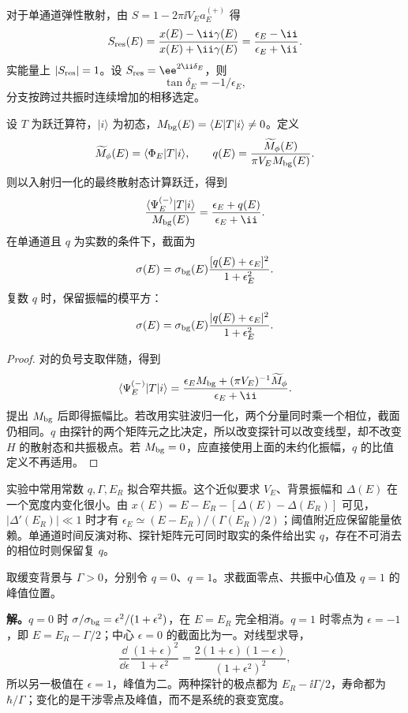 对于单通道弹性散射，由 $S=1-2\pi\ii V_Ea_E^{(+)}$ 得
\[
 S_{\rm res}(E)=\frac{x(E)-\ii\gamma(E)}{x(E)+\ii\gamma(E)}
 =\frac{\epsilon_E-\ii}{\epsilon_E+\ii}.
\]
实能量上 $|S_{\rm res}|=1$。设 $S_{\rm res}=\ee^{2\ii\delta_E}$，则
\begin{equation}
 \tan\delta_E=-1/\epsilon_E,
 \label{eq:fano-phase-shift}
\end{equation}
分支按跨过共振时连续增加的相移选定。

\begin{proposition}
设 $T$ 为跃迁算符，$|i\rangle$ 为初态，$M_{\rm bg}(E)=\langle E|T|i\rangle\ne0$。定义
\[
 \widetilde M_\phi(E)=\langle\Phi_E|T|i\rangle,
 \qquad q(E)=\frac{\widetilde M_\phi(E)}{\pi V_EM_{\rm bg}(E)}.
\]
则以入射归一化的最终散射态计算跃迁，得到
\[
 \frac{\langle\Psi_E^{(-)}|T|i\rangle}{M_{\rm bg}(E)}
 =\frac{\epsilon_E+q(E)}{\epsilon_E+\ii}.
\]
在单通道且 $q$ 为实数的条件下，截面为
\begin{equation}
 \sigma(E)=\sigma_{\rm bg}(E)
 \frac{[q(E)+\epsilon_E]^2}{1+\epsilon_E^2}.
 \label{eq:fano-profile}
\end{equation}
复数 $q$ 时，保留振幅的模平方：
\begin{equation}
\sigma(E)=\sigma_{\rm bg}(E)\frac{|q(E)+\epsilon_E|^2}{1+\epsilon_E^2}.
\label{eq:phys-rl-fano-profile}
\end{equation}
\end{proposition}
\begin{proof}
对的负号支取伴随，得到
\[
 \langle\Psi_E^{(-)}|T|i\rangle
 =\frac{\epsilon_EM_{\rm bg}+(\pi V_E)^{-1}\widetilde M_\phi}
 {\epsilon_E+\ii}.
\]
提出 $M_{\rm bg}$ 后即得振幅比。若改用实驻波归一化，两个分量同时乘一个相位，截面仍相同。$q$ 由探针的两个矩阵元之比决定，所以改变探针可以改变线型，却不改变 $H$ 的散射态和共振极点。若 $M_{\rm bg}=0$，应直接使用上面的未约化振幅，$q$ 的比值定义不再适用。
\end{proof}

实验中常用常数 $q,\Gamma,E_R$ 拟合窄共振。这个近似要求 $V_E$、背景振幅和 $\Delta(E)$ 在一个宽度内变化很小。由
$x(E)=E-E_R-[\Delta(E)-\Delta(E_R)]$
可见，$|\Delta'(E_R)|\ll1$ 时才有 $\epsilon_E\simeq(E-E_R)/(\Gamma(E_R)/2)$；阈值附近应保留能量依赖。单通道时间反演对称、探针矩阵元可同时取实的条件给出实 $q$，存在不可消去的相位时则保留复 $q$。

\begin{workedexample}[相同共振极点下的两种探针线型]
取缓变背景与 $\Gamma>0$，分别令 $q=0$、$q=1$。求截面零点、共振中心值及 $q=1$ 的峰值位置。

\textbf{解。}$q=0$ 时 $\sigma/\sigma_{\rm bg}=\epsilon^2/(1+\epsilon^2)$，在 $E=E_R$ 完全相消。$q=1$ 时零点为 $\epsilon=-1$，即 $E=E_R-\Gamma/2$；中心 $\epsilon=0$ 的截面比为一。对线型求导，
\[
 \frac{\dd}{\dd\epsilon}\frac{(1+\epsilon)^2}{1+\epsilon^2}
 =\frac{2(1+\epsilon)(1-\epsilon)}{(1+\epsilon^2)^2},
\]
所以另一极值在 $\epsilon=1$，峰值为二。两种探针的极点都为 $E_R-\ii\Gamma/2$，寿命都为 $\hbar/\Gamma$；变化的是干涉零点及峰值，而不是系统的衰变宽度。
\end{workedexample}

